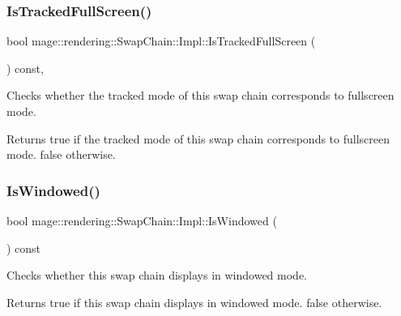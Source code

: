 \subsubsection{\texorpdfstring{Is\+Tracked\+Full\+Screen()}{IsTrackedFullScreen()}}
{\footnotesize\ttfamily bool mage\+::rendering\+::\+Swap\+Chain\+::\+Impl\+::\+Is\+Tracked\+Full\+Screen (\begin{DoxyParamCaption}{ }\end{DoxyParamCaption}) const\hspace{0.3cm}{\ttfamily [private]}, {\ttfamily [noexcept]}}

Checks whether the tracked mode of this swap chain corresponds to fullscreen mode.

\begin{DoxyReturn}{Returns}
{\ttfamily true} if the tracked mode of this swap chain corresponds to fullscreen mode. {\ttfamily false} otherwise. 
\end{DoxyReturn}
\hypertarget{classmage_1_1rendering_1_1_swap_chain_1_1_impl_ac7216dc943fad37a078d1a9d18eb1491}{}\label{classmage_1_1rendering_1_1_swap_chain_1_1_impl_ac7216dc943fad37a078d1a9d18eb1491} 
\subsubsection{\texorpdfstring{Is\+Windowed()}{IsWindowed()}}
{\footnotesize\ttfamily bool mage\+::rendering\+::\+Swap\+Chain\+::\+Impl\+::\+Is\+Windowed (\begin{DoxyParamCaption}{ }\end{DoxyParamCaption}) const\hspace{0.3cm}{\ttfamily [noexcept]}}

Checks whether this swap chain displays in windowed mode.

\begin{DoxyReturn}{Returns}
{\ttfamily true} if this swap chain displays in windowed mode. {\ttfamily false} otherwise. 
\end{DoxyReturn}
\hypertarget{classmage_1_1rendering_1_1_swap_chain_1_1_impl_ad24213091dd95a649f293fb3b3607c34}{}\label{classmage_1_1rendering_1_1_swap_chain_1_1_impl_ad24213091dd95a649f293fb3b3607c34} 
